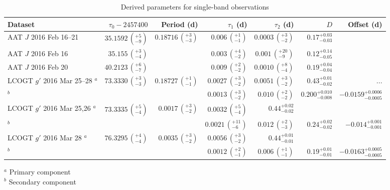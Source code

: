 \documentclass[useAMS,usenatbib]{mn2e}
\begin{document}
\begin{table}
    \caption{Derived parameters for single-band observations}
    \label{tab:single_obs}
    \centering
    \begin{tabular}{lrrrrrr}
    \hline\hline
        Dataset & $\tau_0-2457400$ & Period (d) & $\tau_1$ (d) & $\tau_2$ (d) & $D$ & Offset (d) \\
    \hline
        AAT $J$ 2016 Feb 16--21 & $35.1592\,\left(_{-9}^{+5}\right)$ & $0.18716\,\left(_{-3}^{+3}\right)$ & $0.006\,\left(_{-1}^{+1}\right)$ & $0.0003\,\left(_{-2}^{+3}\right)$ & $0.17_{-0.03}^{+0.03}$ &  \\
        AAT $J$ 2016 Feb 16 & $35.155\,\left(_{-4}^{+3}\right)$ &  & $0.003\,\left(_{-2}^{+4}\right)$ & $0.001\,\left(_{-9}^{+20}\right)$ & $0.12_{-0.05}^{+0.14}$ & \\
        AAT $J$ 2016 Feb 20 & $40.2123\,\left(_{-7}^{+6}\right)$ &  & $0.009\,\left(_{-2}^{+2}\right)$ & $0.0010\,\left(_{-4}^{+8}\right)$ & $0.19_{-0.04}^{+0.04}$ & \\
        LCOGT $g'$ 2016 Mar 25--28 $^a$& $73.3330\,\left(_{-3}^{+3}\right)$ & $0.18727\,\left(_{-1}^{+1}\right)$ & $0.0027\,\left(_{-2}^{+3}\right)$ & $0.0051\,\left(_{-2}^{+3}\right)$ & $0.43_{-0.02}^{+0.01}$ & ...\\
        $^b$&&& $0.0013\,\left(_{-2}^{+3}\right)$ & $0.010\,\left(_{-2}^{+2}\right)$ & $0.200_{-0.008}^{+0.010}$ & $-0.0159_{-0.0005}^{+0.0006}$\\ 
        LCOGT $g'$ 2016 Mar 25,26 $^a$ & $73.3335\,\left(_{-4}^{+5}\right)$ & $0.0017\,\left(_{-2}^{+3}\right)$ & $0.0032\,\left(_{-4}^{+5}\right)$ & $0.44_{-0.02}^{+0.02}$ & \\
        $^b$ &&& $0.0021\,\left(_{-6}^{+11}\right)$ & $0.012\,\left(_{-3}^{+2}\right)$ & $0.24_{-0.02}^{+0.02}$ & $-0.014_{-0.001}^{+0.001}$\\ 
        LCOGT $g'$ 2016 Mar 28 $^a$& $76.3295\,\left(_{-4}^{+4}\right)$ & $0.0035\,\left(_{-2}^{+3}\right)$ & $0.0056\,\left(_{-2}^{+3}\right)$ & $0.44_{-0.01}^{+0.01}$ & \\
        $^b$ &&& $0.0012\,\left(_{-1}^{+2}\right)$ & $0.006\,\left(_{-1}^{+1}\right)$ & $0.19_{-0.01}^{+0.01}$ & $-0.0163_{-0.0005}^{+0.0005}$\\         
    \hline
    \end{tabular}
    \begin{flushleft}
    $^a$ Primary component\\
    $^b$ Secondary component
    \end{flushleft}
\end{table}
\end{document}
